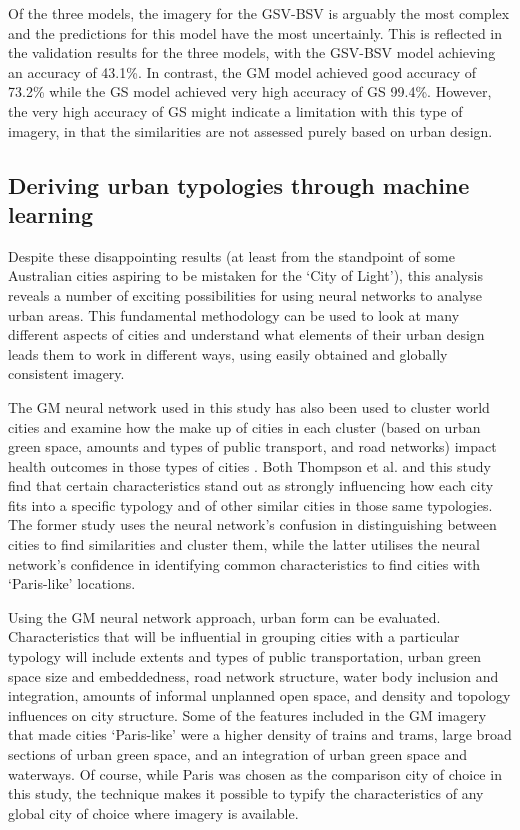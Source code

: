 \documentclass[10pt,letterpaper,hidelinks]{article}
\begin{document}
Of the three models, the imagery for the GSV-BSV is arguably the most complex and the predictions for this model have the most uncertainly. This is reflected in the validation results for the three models, with the GSV-BSV model achieving an accuracy of 43.1\%. In contrast, the GM model achieved good accuracy of 73.2\% while the GS model achieved very high accuracy of GS 99.4\%. However, the very high accuracy of GS might indicate a limitation with this type of imagery, in that the similarities are not assessed purely based on urban design.

\subsection*{Deriving urban typologies through machine learning}

Despite these disappointing results (at least from the standpoint of some Australian cities aspiring to be mistaken for the `City of Light'), this analysis reveals a number of exciting possibilities for using neural networks to analyse urban areas. This fundamental methodology can be used to look at many different aspects of cities and understand what elements of their urban design leads them to work in different ways, using easily obtained and globally consistent imagery. 

The GM neural network used in this study has also been used to cluster world cities and examine how the make up of cities in each cluster (based on urban green space, amounts and types of public transport, and road networks) impact health outcomes in those types of cities \cite{Thompson2018}. Both Thompson et al. and this study find that certain characteristics stand out as strongly influencing how each city fits into a specific typology and of other similar cities in those same typologies. The former study uses the neural network's confusion in distinguishing between cities to find similarities and cluster them, while the latter utilises the neural network's confidence in identifying common characteristics to find cities with `Paris-like' locations. 
 
Using the GM neural network approach, urban form can be evaluated. Characteristics that will be influential in grouping cities with a particular typology will include extents and types of public transportation, urban green space size and embeddedness, road network structure, water body inclusion and integration, amounts of informal unplanned open space, and density and topology influences on city structure. Some of the features included in the GM imagery that made cities `Paris-like' were a higher density of trains and trams, large broad sections of urban green space, and an integration of urban green space and waterways. Of course, while Paris was chosen as the comparison city of choice in this study, the technique makes it possible to typify the characteristics of any global city of choice where imagery is available.
\end{document}
